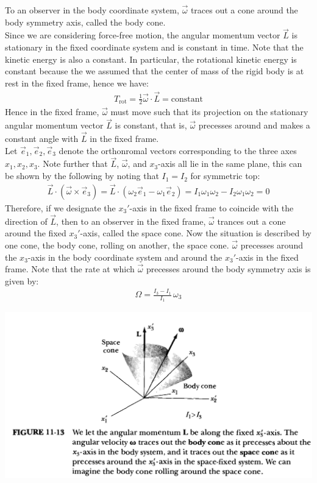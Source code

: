 \documentclass[11pt,oneside]{book}
\theoremstyle{break}
\theoremstyle{break}
\begin{document}
To an observer in the body coordinate system, $\vec{\omega}$ traces out a cone around the body symmetry axis, called the body cone. \\

Since we are considering force-free motion, the angular momentum vector $\vec{L}$ is stationary in the fixed coordinate system and is constant in time. Note that the kinetic energy is also a constant. In particular, the rotational kinetic energy is constant because the we assumed that the center of mass of the rigid body is at rest in the fixed frame, hence we have:
\begin{align*}
T_{\text{rot}} = \frac{1}{2}\vec{\omega}\cdot \vec{L} = \text{constant}
\end{align*}
Hence in the fixed frame, $\vec{\omega}$ must move such that its projection on the stationary angular momentum vector $\vec{L}$ is constant, that is, $\vec{\omega}$ precesses around and makes a constant angle with $\vec{L}$ in the fixed frame. \\


Let $\vec{e}_1,\vec{e}_2,\vec{e}_3$ denote the orthonromal vectors corresponding to the three axes $x_1, x_2, x_3$. Note further that $\vec{L}$, $\vec{\omega}$, and $x_3$-axis all lie in the same plane, this can be shown by the following by noting that $I_1 = I_2$ for symmetric top:
\begin{align*}
\vec{L}\cdot (\vec{\omega} \times \vec{e}_3 ) = \vec{L}\cdot (\omega_2 \vec{e}_1 - \omega_1 \vec{e}_2) = I_1 \omega_1 \omega_2 - I_2 \omega_1 \omega_2 = 0
\end{align*}
Therefore, if we designate the $x_3'$-axis in the fixed frame to coincide with the direction of $\vec{L}$, then to an observer in the fixed frame, $\vec{\omega}$ trances out a cone around the fixed $x_3'$-axis, called the space cone. Now the situation is described by one cone, the body cone, rolling on another, the space cone. $\vec{\omega}$ precesses around the $x_3$-axis in the body coordinate system and around the $x_3'$-axis in the fixed frame. Note that the rate at which $\vec{\omega}$ precesses around the body symmetry axis is given by:
\begin{align*}
\Omega = \frac{I_3 - I_1}{I_1}\, \omega_3
\end{align*}
\begin{center}
\includegraphics[scale=0.39]{cones.png}
\end{center}
\end{document}
